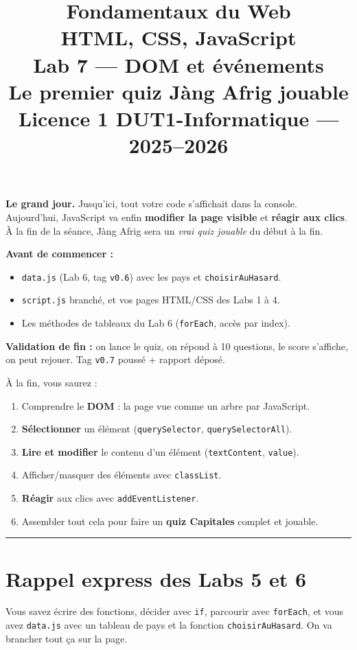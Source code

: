 \documentclass[11pt,a4paper]{article}
\title{%
\vspace{-1cm}
\textbf{\LARGE Fondamentaux du Web}\\
\textbf{\LARGE HTML, CSS, JavaScript}\\[0.8cm]
\textbf{\huge Lab 7 --- DOM et événements}\\[0.3cm]
\textbf{\Large Le premier quiz Jàng Afrig jouable}\\[0.5cm]
\large Licence 1 DUT1-Informatique --- 2025--2026}
\date{}
\author{}
\newcommand{\code}[1]{\texttt{#1}}
\begin{document}
\maketitle
\thispagestyle{empty}

\begin{prereqbox}
\textbf{Le grand jour.} Jusqu'ici, tout votre code s'affichait dans la console. Aujourd'hui, JavaScript va enfin \textbf{modifier la page visible} et \textbf{réagir aux clics}. À la fin de la séance, Jàng Afrig sera un \emph{vrai quiz jouable} du début à la fin.

\smallskip
\textbf{Avant de commencer :}
\begin{itemize}[leftmargin=*,noitemsep]
  \item \code{data.js} (Lab 6, tag \code{v0.6}) avec les pays et \code{choisirAuHasard}.
  \item \code{script.js} branché, et vos pages HTML/CSS des Labs 1 à 4.
  \item Les méthodes de tableaux du Lab 6 (\code{forEach}, accès par index).
\end{itemize}

\smallskip
\textbf{Validation de fin :} on lance le quiz, on répond à 10 questions, le score s'affiche, on peut rejouer. Tag \code{v0.7} poussé + rapport déposé.
\end{prereqbox}

\begin{objectifbox}
À la fin, vous saurez :
\begin{enumerate}[leftmargin=*,noitemsep]
  \item Comprendre le \textbf{DOM} : la page vue comme un arbre par JavaScript.
  \item \textbf{Sélectionner} un élément (\code{querySelector}, \code{querySelectorAll}).
  \item \textbf{Lire et modifier} le contenu d'un élément (\code{textContent}, \code{value}).
  \item Afficher/masquer des éléments avec \code{classList}.
  \item \textbf{Réagir} aux clics avec \code{addEventListener}.
  \item Assembler tout cela pour faire un \textbf{quiz Capitales} complet et jouable.
\end{enumerate}
\end{objectifbox}

\tableofcontents
\bigskip\hrule\bigskip

\section*{Rappel express des Labs 5 et 6}
Vous savez écrire des fonctions, décider avec \code{if}, parcourir avec \code{forEach}, et vous avez \code{data.js} avec un tableau de pays et la fonction \code{choisirAuHasard}. On va brancher tout ça sur la page.
\end{document}
